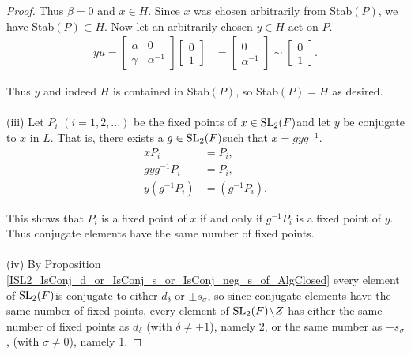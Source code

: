 \begin{proof}
Thus $\beta = 0$ and $x \in H$. Since $x$ was chosen arbitrarily from Stab$(P)$, we have Stab$(P) \subset H$. Now let an arbitrarily chosen $y \in H$ act on $P$. \\
\begin{align*} y u = \begin{bmatrix} \alpha & 0 \\ \gamma & \alpha^{-1} \end{bmatrix} \begin{bmatrix} 0 \\ 1 \end{bmatrix} &= \begin{bmatrix} 0 \\ \alpha^{-1} \end{bmatrix} \sim \begin{bmatrix} 0 \\ 1 \end{bmatrix}.
\end{align*}

Thus $y$ and indeed $H$ is contained in Stab$(P)$, so Stab$(P) = H$ as desired. \\
\\
(iii) Let $P_i$ $(i = 1,2,...)$ be the fixed points of $x\in \operatorname{SL}_2(F)$and let $y$ be conjugate to $x$ in $L$. That is, there exists a $g \in \operatorname{SL}_2(F)$such that $x = gyg^{-1}$.
\begin{align*} x P_i &= P_i,
\\ gyg^{-1} P_i &= P_i,
\\ y(g^{-1} P_i) &= (g^{-1} P_i).
\end{align*}

This shows that $P_i$ is a fixed point of $x$ if and only if $g^{-1} P_i$ is a fixed point of $y$. Thus conjugate elements have the same number of fixed points. \\
\\
(iv) By Proposition \ref{ISL2_IsConj_d_or_IsConj_s_or_IsConj_neg_s_of_AlgClosed} every  element of $\operatorname{SL}_2(F)$is conjugate to either $d_\delta$ or $\pm s_\sigma$, so since conjugate elements have the same number of fixed points, every element of $\operatorname{SL}_2(F)\! \setminus \! Z$ has either the same number of fixed points as $d_\delta$ (with $\delta \neq \pm 1$), namely 2, or the same number as $\pm s_\sigma$, (with $\sigma \neq 0$), namely 1.

\end{proof}


